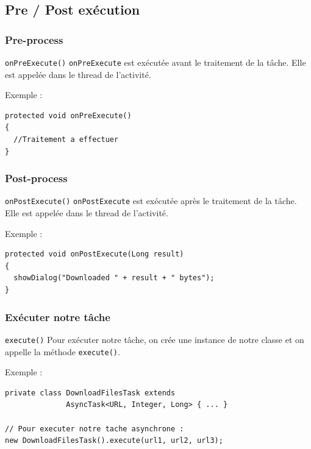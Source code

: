 \documentclass{beamer}
\begin{document}
\subsection{Pre / Post exécution}
\begin{frame}[fragile]
\frametitle{Pre-process}

\begin{block}{\verb!onPreExecute()!}
\verb!onPreExecute! est exécutée avant le traitement de la tâche. Elle est appelée dans le thread de l'activité.
\end{block}

\begin{exampleblock}{Exemple :}
\begin{lstlisting}
protected void onPreExecute()
{
  //Traitement a effectuer
}
\end{lstlisting}
\end{exampleblock}
\end{frame}
\begin{frame}[fragile]
\frametitle{Post-process}

\begin{block}{\verb!onPostExecute()!}
\verb!onPostExecute! est exécutée après le traitement de la tâche. Elle est appelée dans le thread de l'activité.
\end{block}

\begin{exampleblock}{Exemple :}
\begin{lstlisting}
protected void onPostExecute(Long result)
{
  showDialog("Downloaded " + result + " bytes");
}
\end{lstlisting}
\end{exampleblock}
\end{frame}

\begin{frame}[fragile]
\frametitle{Exécuter notre tâche}

\begin{block}{\verb!execute()!}
Pour exécuter notre tâche, on crée une instance de notre classe et on appelle la méthode \verb!execute()!.
\end{block}
\begin{exampleblock}{Exemple :}
\begin{lstlisting}
private class DownloadFilesTask extends
              AsyncTask<URL, Integer, Long> { ... }

// Pour executer notre tache asynchrone :
new DownloadFilesTask().execute(url1, url2, url3);
\end{lstlisting}
\end{exampleblock}

\end{frame}
\end{document}
